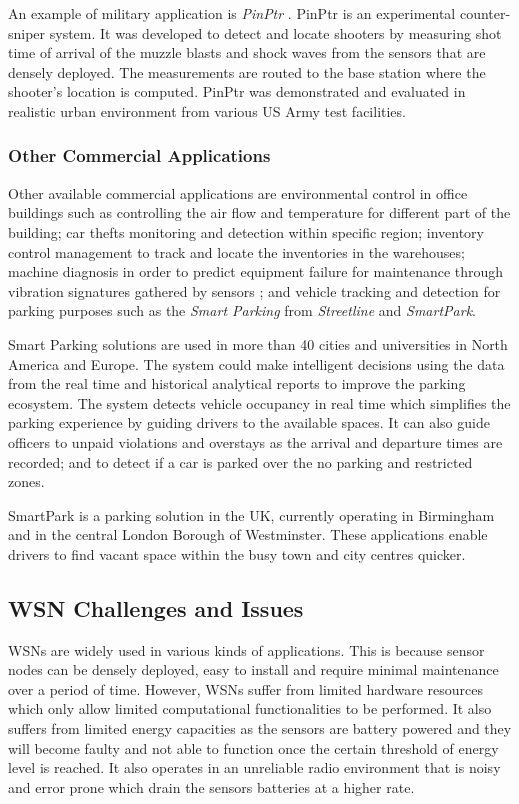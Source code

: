 An example of military application is \textit{PinPtr} \cite{Simonpinptr}. PinPtr is an experimental counter-sniper system. It was developed to detect and locate shooters by measuring shot time of arrival of the muzzle blasts and shock waves from the sensors that are densely deployed. The measurements are routed to the base station where the shooter's location is computed. PinPtr was demonstrated and evaluated in realistic urban environment from various US Army test facilities.

\subsubsection{Other Commercial Applications}
Other available commercial applications are environmental control in office buildings such as controlling the air flow and temperature for different part of the building; car thefts monitoring and detection within specific region; inventory control management to track and locate the inventories in the warehouses; machine diagnosis in order to predict equipment failure for maintenance through vibration signatures gathered by sensors \cite{industrialsensor}; and vehicle tracking and detection for parking purposes such as the \textit{Smart Parking} from \textit{Streetline} and \textit{SmartPark}. 

Smart Parking solutions are used in more than 40 cities and universities in North America and Europe. The system could make intelligent decisions using the data from the real time and historical analytical reports to improve the parking ecosystem. The system detects vehicle occupancy in real time which simplifies the parking experience by guiding drivers to the available spaces. It can also guide officers to unpaid violations and overstays as the arrival and departure times are recorded; and to detect if a car is parked over the no parking and restricted zones. 

SmartPark is a parking solution in the UK, currently operating in Birmingham and in the central London Borough of Westminster. These applications enable drivers to find vacant space within the busy town and city centres quicker.

\subsection{WSN Challenges and Issues}
WSNs are widely used in various kinds of applications. This is because sensor nodes can be densely deployed, easy to install and require minimal maintenance over a period of time. However, WSNs suffer from limited hardware resources which only allow limited computational functionalities to be performed. It also suffers from limited energy capacities as the sensors are battery powered and they will become faulty and not able to function once the certain threshold of energy level is reached. It also operates in an unreliable radio environment that is noisy and error prone which drain the sensors batteries at a higher rate.

